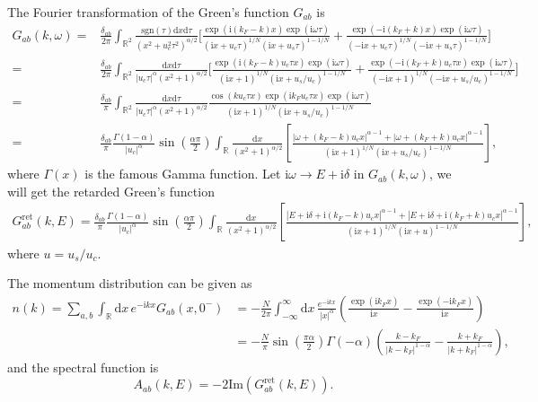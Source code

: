 \documentclass[10pt]{extarticle}
\newcommand{\ii}{\mathrm{i}}
\begin{document}
The Fourier transformation of the Green's function $G_{ab}$ is
\[
\begin{aligned}
	G_{ab}(k,\omega)=&\frac{\delta_{ab}}{2\pi}\int_{\mathbb{R}^2}\frac{\mathrm{sgn}(\tau)\mathrm{d}x\mathrm{d}\tau}{(x^2+u_c^2\tau^2)^{\alpha/2}}\biggl[\frac{\exp(\ii (k_F-k) x)\exp(\ii \omega\tau)}{(\ii x+u_c\tau)^{1/N}(\ii x+u_s\tau)^{1-1/N}}+\frac{\exp(-\ii (k_F+k) x)\exp(\ii \omega\tau)}{(-\ii x+u_c\tau)^{1/N}(-\ii x+u_s\tau)^{1-1/N}}\biggr]\\
	=&\frac{\delta_{ab}}{2\pi}\int_{\mathbb{R}^2}\frac{\mathrm{d}x\mathrm{d}\tau}{|u_c\tau|^{\alpha}(x^2+1)^{\alpha/2}}\biggl[\frac{\exp(\ii (k_F-k)u_c\tau x)\exp(\ii \omega\tau)}{(\ii x+1)^{1/N}(\ii x+u_s/u_c)^{1-1/N}}+\frac{\exp(-\ii (k_F+k)u_c\tau x)\exp(\ii \omega\tau)}{(-\ii x+1)^{1/N}(-\ii x+u_s/u_c)^{1-1/N}}\biggr]\\
	=&\frac{\delta_{ab}}{\pi}\int_{\mathbb{R}^2}\frac{\mathrm{d}x\mathrm{d}\tau}{|u_c\tau|^{\alpha}(x^2+1)^{\alpha/2}}\frac{\cos(ku_c\tau x)\exp(\ii k_Fu_c\tau x)\exp(\ii \omega\tau)}{(\ii x+1)^{1/N}(\ii x+u_s/u_c)^{1-1/N}}\\
	=&\frac{\delta_{ab}}{\pi}\frac{\Gamma(1-\alpha)}{|u_c|^\alpha}\sin\left(\frac{\alpha\pi}{2}\right)\int_{\mathbb{R}}\frac{\mathrm{d}x}{(x^2+1)^{\alpha/2}}\left[\frac{|\omega+(k_F-k)u_cx|^{\alpha-1}+|\omega+(k_F+k)u_cx|^{\alpha-1}}{(\ii x+1)^{1/N}(\ii x+u_s/u_c)^{1-1/N}}\right],
\end{aligned}
\]
where $\Gamma(x)$ is the famous Gamma function. Let $\ii\omega\to E+\ii\delta$ in $G_{ab}(k,\omega)$, we will get the retarded Green's function
\[
\begin{aligned}
	G^{\text{ret}}_{ab}(k,E)=\frac{\delta_{ab}}{\pi}\frac{\Gamma(1-\alpha)}{|u_c|^\alpha}\sin\left(\frac{\alpha\pi}{2}\right)\int_{\mathbb{R}}\frac{\mathrm{d}x}{(x^2+1)^{\alpha/2}}\left[\frac{|E+\ii \delta+\ii (k_F-k)u_cx|^{\alpha-1}+|E+\ii\delta+\ii (k_F+k)u_cx|^{\alpha-1}}{(\ii x+1)^{1/N}(\ii x+u)^{1-1/N}}\right],
\end{aligned}
\]
where $u=u_s/u_c$.

The momentum distribution can be given as
\[
\begin{aligned}
	n(k)=\sum_{a,b}\int_\mathbb{R} \mathrm{d}x\, e^{-\ii kx}G_{ab}(x,0^-)&=-\frac{N}{2\pi} \int_{-\infty}^\infty \mathrm{d}x\,\frac{e^{-\ii kx}}{|x|^\alpha}\left(\frac{\exp(\ii k_F x)}{\ii x}-\frac{\exp(-\ii k_F x)}{\ii x}\right)\\
	&=-\frac{N}{\pi}\sin \left(\frac{\pi  \alpha }{2}\right) \Gamma (-\alpha ) \left(\frac{k-k_F}{\left| k-k_F\right| ^{1-\alpha}}-\frac{k+k_F}{\left| k+k_F\right| ^{1-\alpha}}\right),
\end{aligned}
\]
and the spectral function is 
\[
	A_{ab}(k,E)=-2\mathrm{Im} \left(G^{\text{ret}}_{ab}(k,E)\right).
\]
\end{document}
